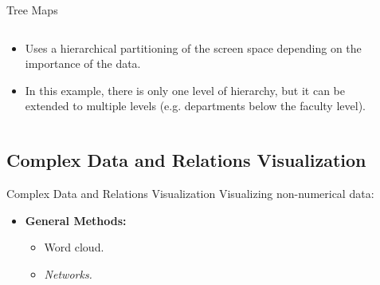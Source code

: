 \begin{frame}{Tree Maps}
	\begin{columns}[t]
		\begin{column}{0.45\textwidth}
			\begin{itemize}
				\item Uses a hierarchical partitioning of the screen space depending on the importance of the data.
				\item In this example, there is only one level of hierarchy, but it can be extended to multiple levels (e.g. departments below the faculty level).
			\end{itemize}
		\end{column}
		\begin{column}{0.45\textwidth}
			\begin{center}
			\end{center}
		\end{column}
	\end{columns}
\end{frame}

\subsection{Complex Data and Relations Visualization}

\begin{frame}{Complex Data and Relations Visualization}
	Visualizing non-numerical data:

	\vspace*{0.2cm}

	\begin{itemize}
		\item \textbf{General Methods:}
		      \begin{itemize}
			      \item Word cloud.
			      \item \textit{Networks.}
		      \end{itemize}
	\end{itemize}
\end{frame}

